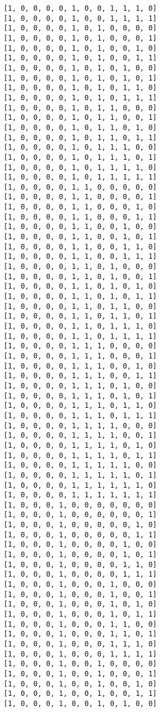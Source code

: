 \documentclass[11pt]{article}
\begin{document}
\begin{Verbatim}[commandchars=\\\{\}]
[1, 0, 0, 0, 0, 1, 0, 0, 1, 1, 1, 0]
[1, 0, 0, 0, 0, 1, 0, 0, 1, 1, 1, 1]
[1, 0, 0, 0, 0, 1, 0, 1, 0, 0, 0, 0]
[1, 0, 0, 0, 0, 1, 0, 1, 0, 0, 0, 1]
[1, 0, 0, 0, 0, 1, 0, 1, 0, 0, 1, 0]
[1, 0, 0, 0, 0, 1, 0, 1, 0, 0, 1, 1]
[1, 0, 0, 0, 0, 1, 0, 1, 0, 1, 0, 0]
[1, 0, 0, 0, 0, 1, 0, 1, 0, 1, 0, 1]
[1, 0, 0, 0, 0, 1, 0, 1, 0, 1, 1, 0]
[1, 0, 0, 0, 0, 1, 0, 1, 0, 1, 1, 1]
[1, 0, 0, 0, 0, 1, 0, 1, 1, 0, 0, 0]
[1, 0, 0, 0, 0, 1, 0, 1, 1, 0, 0, 1]
[1, 0, 0, 0, 0, 1, 0, 1, 1, 0, 1, 0]
[1, 0, 0, 0, 0, 1, 0, 1, 1, 0, 1, 1]
[1, 0, 0, 0, 0, 1, 0, 1, 1, 1, 0, 0]
[1, 0, 0, 0, 0, 1, 0, 1, 1, 1, 0, 1]
[1, 0, 0, 0, 0, 1, 0, 1, 1, 1, 1, 0]
[1, 0, 0, 0, 0, 1, 0, 1, 1, 1, 1, 1]
[1, 0, 0, 0, 0, 1, 1, 0, 0, 0, 0, 0]
[1, 0, 0, 0, 0, 1, 1, 0, 0, 0, 0, 1]
[1, 0, 0, 0, 0, 1, 1, 0, 0, 0, 1, 0]
[1, 0, 0, 0, 0, 1, 1, 0, 0, 0, 1, 1]
[1, 0, 0, 0, 0, 1, 1, 0, 0, 1, 0, 0]
[1, 0, 0, 0, 0, 1, 1, 0, 0, 1, 0, 1]
[1, 0, 0, 0, 0, 1, 1, 0, 0, 1, 1, 0]
[1, 0, 0, 0, 0, 1, 1, 0, 0, 1, 1, 1]
[1, 0, 0, 0, 0, 1, 1, 0, 1, 0, 0, 0]
[1, 0, 0, 0, 0, 1, 1, 0, 1, 0, 0, 1]
[1, 0, 0, 0, 0, 1, 1, 0, 1, 0, 1, 0]
[1, 0, 0, 0, 0, 1, 1, 0, 1, 0, 1, 1]
[1, 0, 0, 0, 0, 1, 1, 0, 1, 1, 0, 0]
[1, 0, 0, 0, 0, 1, 1, 0, 1, 1, 0, 1]
[1, 0, 0, 0, 0, 1, 1, 0, 1, 1, 1, 0]
[1, 0, 0, 0, 0, 1, 1, 0, 1, 1, 1, 1]
[1, 0, 0, 0, 0, 1, 1, 1, 0, 0, 0, 0]
[1, 0, 0, 0, 0, 1, 1, 1, 0, 0, 0, 1]
[1, 0, 0, 0, 0, 1, 1, 1, 0, 0, 1, 0]
[1, 0, 0, 0, 0, 1, 1, 1, 0, 0, 1, 1]
[1, 0, 0, 0, 0, 1, 1, 1, 0, 1, 0, 0]
[1, 0, 0, 0, 0, 1, 1, 1, 0, 1, 0, 1]
[1, 0, 0, 0, 0, 1, 1, 1, 0, 1, 1, 0]
[1, 0, 0, 0, 0, 1, 1, 1, 0, 1, 1, 1]
[1, 0, 0, 0, 0, 1, 1, 1, 1, 0, 0, 0]
[1, 0, 0, 0, 0, 1, 1, 1, 1, 0, 0, 1]
[1, 0, 0, 0, 0, 1, 1, 1, 1, 0, 1, 0]
[1, 0, 0, 0, 0, 1, 1, 1, 1, 0, 1, 1]
[1, 0, 0, 0, 0, 1, 1, 1, 1, 1, 0, 0]
[1, 0, 0, 0, 0, 1, 1, 1, 1, 1, 0, 1]
[1, 0, 0, 0, 0, 1, 1, 1, 1, 1, 1, 0]
[1, 0, 0, 0, 0, 1, 1, 1, 1, 1, 1, 1]
[1, 0, 0, 0, 1, 0, 0, 0, 0, 0, 0, 0]
[1, 0, 0, 0, 1, 0, 0, 0, 0, 0, 0, 1]
[1, 0, 0, 0, 1, 0, 0, 0, 0, 0, 1, 0]
[1, 0, 0, 0, 1, 0, 0, 0, 0, 0, 1, 1]
[1, 0, 0, 0, 1, 0, 0, 0, 0, 1, 0, 0]
[1, 0, 0, 0, 1, 0, 0, 0, 0, 1, 0, 1]
[1, 0, 0, 0, 1, 0, 0, 0, 0, 1, 1, 0]
[1, 0, 0, 0, 1, 0, 0, 0, 0, 1, 1, 1]
[1, 0, 0, 0, 1, 0, 0, 0, 1, 0, 0, 0]
[1, 0, 0, 0, 1, 0, 0, 0, 1, 0, 0, 1]
[1, 0, 0, 0, 1, 0, 0, 0, 1, 0, 1, 0]
[1, 0, 0, 0, 1, 0, 0, 0, 1, 0, 1, 1]
[1, 0, 0, 0, 1, 0, 0, 0, 1, 1, 0, 0]
[1, 0, 0, 0, 1, 0, 0, 0, 1, 1, 0, 1]
[1, 0, 0, 0, 1, 0, 0, 0, 1, 1, 1, 0]
[1, 0, 0, 0, 1, 0, 0, 0, 1, 1, 1, 1]
[1, 0, 0, 0, 1, 0, 0, 1, 0, 0, 0, 0]
[1, 0, 0, 0, 1, 0, 0, 1, 0, 0, 0, 1]
[1, 0, 0, 0, 1, 0, 0, 1, 0, 0, 1, 0]
[1, 0, 0, 0, 1, 0, 0, 1, 0, 0, 1, 1]
[1, 0, 0, 0, 1, 0, 0, 1, 0, 1, 0, 0]

\end{Verbatim}
\end{document}
